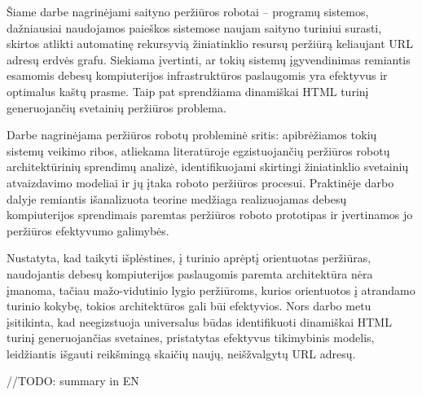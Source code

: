 


Šiame darbe nagrinėjami saityno peržiūros robotai -- programų sistemos, dažniausiai naudojamos paieškos sistemose naujam saityno turiniui surasti, skirtos atlikti automatinę rekursyvią žiniatinklio resursų peržiūrą keliaujant URL adresų erdvės grafu. Siekiama įvertinti, ar tokių sistemų įgyvendinimas remiantis esamomis debesų kompiuterijos infrastruktūros paslaugomis yra efektyvus ir optimalus kaštų prasme. Taip pat sprendžiama dinamiškai HTML turinį generuojančių svetainių peržiūros problema. 

Darbe nagrinėjama peržiūros robotų probleminė sritis: apibrėžiamos tokių sistemų veikimo ribos, atliekama literatūroje egzistuojančių peržiūros robotų architektūrinių sprendimų analizė, identifikuojami skirtingi žiniatinklio svetainių atvaizdavimo modeliai ir jų įtaka roboto peržiūros procesui. Praktinėje darbo dalyje remiantis išanalizuota teorine medžiaga realizuojamas debesų kompiuterijos sprendimais paremtas peržiūros roboto prototipas ir įvertinamos jo peržiūros efektyvumo galimybės.

Nustatyta, kad taikyti išplėstines, į turinio aprėptį orientuotas peržiūras, naudojantis debesų kompiuterijos paslaugomis paremta architektūra nėra įmanoma, tačiau mažo-vidutinio lygio peržiūroms, kurios orientuotos į atrandamo turinio kokybę, tokios architektūros gali būi efektyvios. Nors darbo metu įsitikinta, kad neegizstuoja universalus būdas identifikuoti dinamiškai HTML turinį generuojančias svetaines, pristatytas efektyvus tikimybinis modelis, leidžiantis išgauti reikšmingą skaičių naujų, neišžvalgytų URL adresų.  



//TODO: summary in EN

